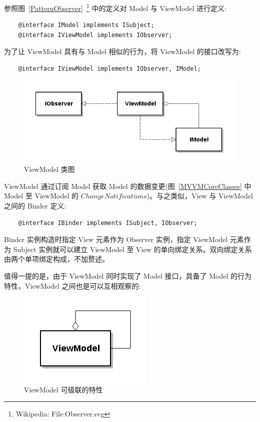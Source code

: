 参照图~\ref{PatternObserver}~\footnote{Wikipedia: File:Observer.svg} 中的定义对 Model 与 ViewModel 进行定义:

\begin{verbatim}
    @interface IModel implements ISubject;
    @interface IViewModel implements IObserver;
\end{verbatim}

为了让 ViewModel 具有与 Model 相似的行为，将 ViewModel 的接口改写为:

\begin{verbatim}
    @interface IViewModel implements IObserver, IModel;
\end{verbatim}

\begin{figure}[!h]
  \begin{center}
    \includegraphics[scale=0.5]{figures/diagram-viewmodel.png}
    \caption{ViewModel 类图\label{ViewModelClass}}
  \end{center}
\end{figure}

ViewModel 通过订阅 Model 获取 Model 的数据变更(图~\ref{MVVMCoreClasses} 中 Model 至 ViewModel 的 $Change Notifications$)。与之类似，View 与 ViewModel 之间的 Binder 定义:

\begin{verbatim}
    @interface IBinder implements ISubject, IObserver;
\end{verbatim}

Binder 实例构造时指定 View 元素作为 Observer 实例，指定 ViewModel 元素作为 Subject 实例就可以建立 ViewModel 至 View 的单向绑定关系。双向绑定关系由两个单项绑定构成，不加赘述。

值得一提的是，由于 ViewModel 同时实现了 Model 接口，具备了 Model 的行为特性，ViewModel 之间也是可以互相观察的:

\begin{figure}[!h]
  \begin{center}
    \includegraphics[scale=0.5]{figures/diagram-viewmodel-cascading.png}
    \caption{ViewModel 可级联的特性\label{ViewModelCascading}}
  \end{center}
\end{figure}

